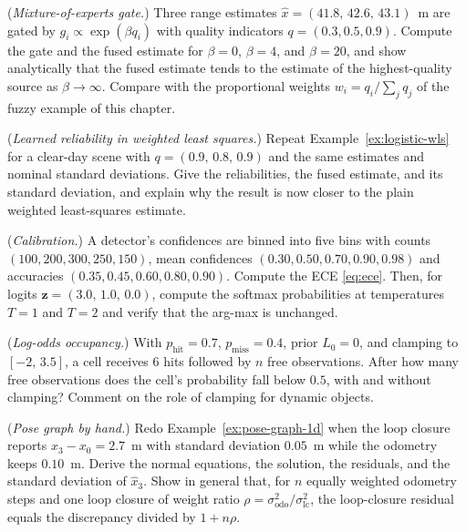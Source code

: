 \begin{prob}\label{prob:ch04:1}
(\emph{Mixture-of-experts gate.}) Three range estimates $\widehat{x}=(41.8,\,42.6,\,43.1)$~m are gated by $g_i\propto\exp(\beta q_i)$ with quality indicators $q=(0.3,0.5,0.9)$. Compute the gate and the fused estimate for $\beta=0$, $\beta=4$, and $\beta=20$, and show analytically that the fused estimate tends to the estimate of the highest-quality source as $\beta\to\infty$. Compare with the proportional weights $w_i=q_i/\sum_j q_j$ of the fuzzy example of this chapter.
\end{prob}
\begin{prob}\label{prob:ch04:2}
(\emph{Learned reliability in weighted least squares.}) Repeat Example~\ref{ex:logistic-wls} for a clear-day scene with $q=(0.9,\,0.8,\,0.9)$ and the same estimates and nominal standard deviations. Give the reliabilities, the fused estimate, and its standard deviation, and explain why the result is now closer to the plain weighted least-squares estimate.
\end{prob}
\begin{prob}\label{prob:ch04:3}
(\emph{Calibration.}) A detector's confidences are binned into five bins with counts $(100,200,300,250,150)$, mean confidences $(0.30,0.50,0.70,0.90,0.98)$ and accuracies $(0.35,0.45,0.60,0.80,0.90)$. Compute the ECE \eqref{eq:ece}. Then, for logits $\mathbf{z}=(3.0,\,1.0,\,0.0)$, compute the softmax probabilities at temperatures $T=1$ and $T=2$ and verify that the arg-max is unchanged.
\end{prob}
\begin{prob}\label{prob:ch04:4}
(\emph{Log-odds occupancy.}) With $p_{\mathrm{hit}}=0.7$, $p_{\mathrm{miss}}=0.4$, prior $L_0=0$, and clamping to $[-2,\,3.5]$, a cell receives $6$ hits followed by $n$ free observations. After how many free observations does the cell's probability fall below $0.5$, with and without clamping? Comment on the role of clamping for dynamic objects.
\end{prob}
\begin{prob}\label{prob:ch04:5}
(\emph{Pose graph by hand.}) Redo Example~\ref{ex:pose-graph-1d} when the loop closure reports $x_3-x_0=2.7$~m with standard deviation $0.05$~m while the odometry keeps $0.10$~m. Derive the normal equations, the solution, the residuals, and the standard deviation of $\widehat{x}_3$. Show in general that, for $n$ equally weighted odometry steps and one loop closure of weight ratio $\rho=\sigma_{\mathrm{odo}}^{2}/\sigma_{\mathrm{lc}}^{2}$, the loop-closure residual equals the discrepancy divided by $1+n\rho$.
\end{prob}
